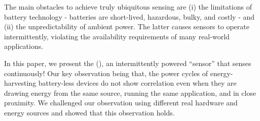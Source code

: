%
%
%
The main obstacles to achieve truly ubiquitous sensing are (i) the limitations of battery technology - batteries are short-lived, hazardous, bulky, and costly - and (ii) the unpredictability of ambient power. The latter causes sensors to operate intermittently, violating the availability requirements of many real-world applications. 

In this paper, we present the \textit{\fullcis} (\cis), an intermittently powered ``sensor'' that senses continuously!
Our key observation being that, the power cycles of energy-harvesting battery-less devices do not show correlation even when they are drawing energy from the same source, running the same application, and in close proximity.
We challenged our observation using different real hardware and energy sources and showed that this observation holds.

